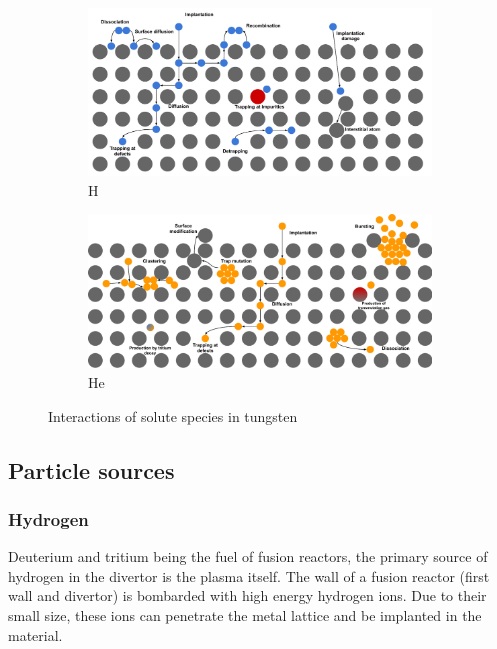 \begin{figure}[h!]
    \begin{subfigure}{0.9\linewidth}
        \includegraphics[width=\linewidth]{Figures/Chapter1/HI transport sketch.pdf}
        \caption{H}
    \end{subfigure}
    \begin{subfigure}{0.9\linewidth}
        \includegraphics[width=\linewidth]{Figures/Chapter1/He transport sketch.pdf}
        \caption{He}
    \end{subfigure}
    \caption{Interactions of solute species in tungsten}
\end{figure}

\subsection{Particle sources}

\subsubsection{Hydrogen}
Deuterium and tritium being the fuel of fusion reactors, the primary source of hydrogen in the divertor is the plasma itself.
The wall of a fusion reactor (first wall and divertor) is bombarded with high energy hydrogen ions.
Due to their small size, these ions can penetrate the metal lattice and be implanted in the material.

